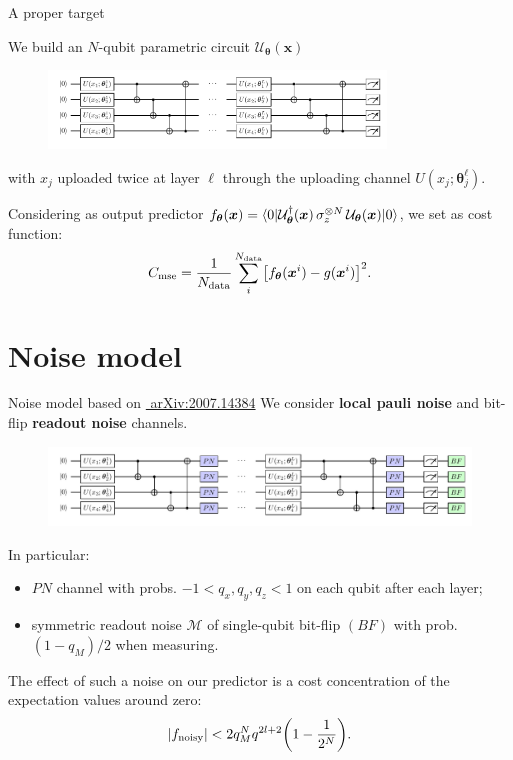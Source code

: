 \documentclass[8pt, xcolor={svgnames}, hyperref={linkcolor=black}, aspectratio=169]{beamer}
\newcommand{\equals}{=}
\begin{document}
\begin{frame}{A proper target}
\begin{tcolorbox}[colback=red!20, title=\faCrosshairs\,\, $N$-dimensional fit: $y \equals g(\bm{x})$]
We build an $N$-qubit parametric circuit $\mathcal{U}_{\bm{\theta}}(\bm{x})$
\begin{figure}
\includegraphics[width=0.8\textwidth]{figures/circ.pdf}
\end{figure}
\vspace{-0.3cm}
with $x_j$ uploaded twice at layer $\ell$ through the uploading channel $U(x_j; \bm{\theta}_j^{\ell})$.
\end{tcolorbox}
\pause
\begin{tcolorbox}[colback=blue!20, title=\faPaypal\,\, Cost function]
Considering as output predictor $f_{\bm{\theta}}(\bm{x}) = \braket{0|\mathcal{U}_{\bm{\theta}}^{\dagger}(\bm{x})\,
\sigma_z^{\otimes N} \,\mathcal{U}_{\bm{\theta}}(\bm{x})|0}$, we set as cost function:
$$ C_{\rm mse} = \frac{1}{N_{\rm data}}\sum_i^{N_{\rm data}} 
  \bigl[ f_{\bm{\theta}}(\bm{x}^i) - g(\bm{x}^i) \bigr]^2. $$
\end{tcolorbox}
\end{frame}

\section{Noise model}

\begin{frame}{Noise model based on \hfill \href{https://arxiv.org/abs/2007.14384}{\faBook\,\,arXiv:2007.14384}}
We consider \textbf{local pauli noise} and bit-flip \textbf{readout noise} channels.
\begin{figure}
\includegraphics[width=1\textwidth]{figures/noisy.pdf}
\end{figure}
In particular:
\begin{itemize}[noitemsep]
\item[\faVolumeUp] $PN$ channel with probs. $-1 < q_x, q_y, q_z < 1$
on each qubit after each layer;
\item[\faRandom] symmetric readout noise $\mathcal{M}$ of single-qubit bit-flip $(BF)$ 
with prob. $(1-q_M)/2$ when measuring.
\end{itemize}
\pause
\begin{tcolorbox}[colback=red!15, title=Noise effect]
The effect of such a noise on our predictor is a cost concentration of the expectation
values around zero:
$$ |f_{\rm noisy}| < 2 q_M^N q^{2l + 2} \biggl(1-\frac{1}{2^N}\biggr). $$
\end{tcolorbox}
\end{frame}
\end{document}
